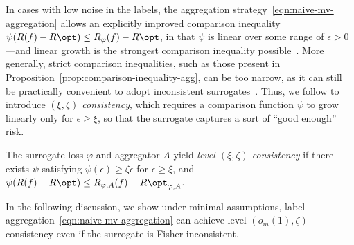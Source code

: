 \documentclass[11pt]{article}
\newcommand{\sloss}{\varphi}  %
\begin{document}
In cases with low noise in the labels, the aggregation
strategy~\eqref{eqn:naive-mv-aggregation} allows an explicitly improved
comparison inequality $\psi(R(f) - R\opt) \le R_\sloss(f) - R\opt$, in that
$\psi$ is linear over some range of $\epsilon > 0$---and linear growth is
the strongest comparison inequality possible~\citep{OsokinBaLa17,
  NowakBaRu20}.
%
More generally, strict comparison inequalities, such as those
present in Proposition~\ref{prop:comparison-inequality-agg}, can be too
narrow, as it can still be practically convenient to adopt
inconsistent surrogates~\citep{Liu07, OsokinBaLa17, NowakBaRu20}.
%
Thus, we follow \citet{OsokinBaLa17} to introduce \emph{$(\xi, \zeta)$
consistency}, which requires a comparison function $\psi$ to grow linearly
only for $\epsilon \ge \xi$, so that the surrogate captures a sort of ``good
enough'' risk.
\begin{definition}
  \label{definition:almost-linear-consistency}
  The surrogate loss $\sloss$ and aggregator $A$ yield \emph{level-$(\xi,
  \zeta)$ consistency} if there exists $\psi$ satisfying $\psi(\epsilon) \ge
  \zeta \epsilon$ for $\epsilon \ge \xi$, and $\psi(R(f) - R\opt) \le
  R_{\sloss, A}(f) - R\opt_{\sloss,A}$.
\end{definition}
\noindent
In the following discussion, we show under minimal assumptions, label
aggregation~\eqref{eqn:naive-mv-aggregation}
can achieve level-$(o_m(1), \zeta)$ consistency even if the
surrogate is Fisher inconsistent.
\end{document}
